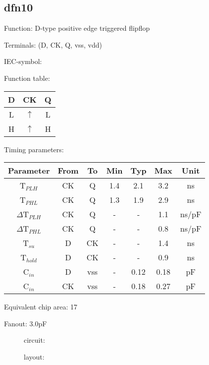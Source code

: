 \subsection{dfn10}
Function: D-type positive edge triggered flipflop

Terminals: (D, CK, Q, vss, vdd)


IEC-symbol:
\begin{figure}[h]
\end{figure}

Function table:
\begin{table}[h]
\begin{tabular}{|c|c||c|}
\hline
D	&CK	&Q\\
\hline
L	&$\uparrow$	&L\\
H	&$\uparrow$	&H\\
\hline
\end{tabular}
\vspace{1cm}

Timing parameters:\\

\begin{tabular}{|c|cc|ccc|c|}
\hline
Parameter               &From            &To   &Min	&Typ	&Max    &Unit\\
\hline
T$_{PLH}$               &CK     	&Q     &1.4	&2.1	&3.2    &ns\\
T$_{PHL}$               &CK    		&Q     &1.3	&1.9	&2.9    &ns\\
\hline
$\Delta$T$_{PLH}$       &CK          	&Q	&-	&-	&1.1    &ns/pF\\
$\Delta$T$_{PHL}$       &CK           	&Q    	&-	&-	&0.8    &ns/pF\\
\hline
T$_{su}$		&D		&CK	&-	&-	&1.4	&ns\\
T$_{hold}$		&D		&CK	&-	&-	&0.9	&ns\\
\hline
C$_{in}$                &D	    	&vss    &-	&0.12	&0.18   &pF\\
C$_{in}$                &CK	    	&vss    &-	&0.18	&0.27   &pF\\
\hline
\end{tabular}
\end{table}

Equivalent chip area: 17

Fanout:	3.0pF

\begin{figure}[bth]
circuit:\\

\end{figure}

\begin{figure}[bth]
layout:\\

\end{figure}


\clearpage
